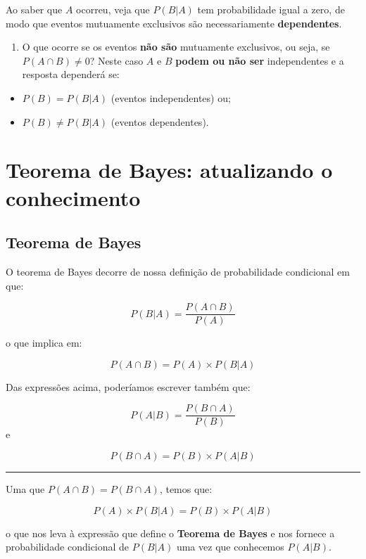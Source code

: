 \documentclass[
]{book}
\providecommand{\tightlist}{%
  \setlength{\itemsep}{0pt}\setlength{\parskip}{0pt}}
\begin{document}
Ao saber que \(A\) ocorreu, veja que \(P(B|A)\) tem probabilidade igual a zero, de modo que eventos mutuamente exclusivos são necessariamente \textbf{dependentes}.

\begin{enumerate}
\def\labelenumi{\arabic{enumi}.}
\setcounter{enumi}{6}
\tightlist
\item
  O que ocorre se os eventos \textbf{não são} mutuamente exclusivos, ou seja, se \(P(A \cap B) \ne 0\)? Neste caso \(A\) e \(B\) \textbf{podem ou não ser} independentes e a resposta dependerá se:
\end{enumerate}

\begin{itemize}
\tightlist
\item
  \(P(B) = P(B|A)\) (eventos independentes) ou;
\item
  \(P(B) \ne P(B|A)\) (eventos dependentes).
\end{itemize}

\hypertarget{tbayes}{%
\chapter{Teorema de Bayes: atualizando o conhecimento}\label{tbayes}}

\hypertarget{teorema-de-bayes}{%
\section{Teorema de Bayes}\label{teorema-de-bayes}}

O teorema de Bayes decorre de nossa definição de probabilidade condicional em que:

\[P(B|A) = \frac{P(A \cap B)}{P(A)}\]

o que implica em:

\[P(A \cap B) = P(A) \times P(B|A)\]

Das expressões acima, poderíamos escrever também que:

\[P(A|B) = \frac{P(B \cap A)}{P(B)}\]
e

\[P(B \cap A) = P(B) \times P(A|B)\]

\begin{center}\rule{0.5\linewidth}{0.5pt}\end{center}

Uma que \(P(A \cap B) = P(B \cap A)\), temos que:

\[P(A) \times P(B|A) = P(B) \times P(A|B)\]

o que nos leva à expressão que define o \textbf{Teorema de Bayes} e nos fornece a probabilidade condicional de \(P(B|A)\) uma vez que conhecemos \(P(A|B)\).
\end{document}
